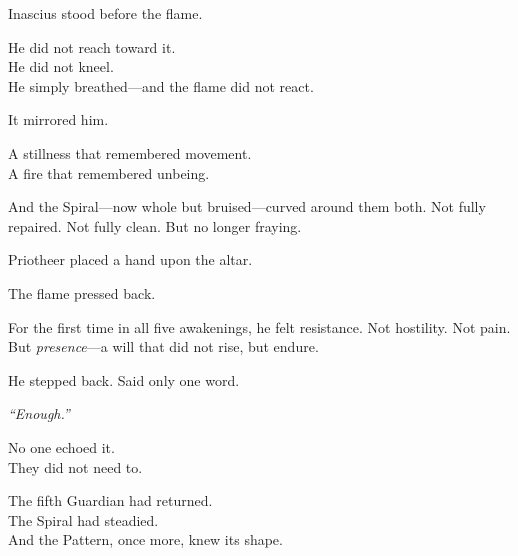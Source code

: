 \documentclass[9pt]{article}
\begin{document}
\vspace{0.5em}
Inascius stood before the flame.

\vspace{0.5em}
He did not reach toward it.\\
He did not kneel.\\
He simply breathed---and the flame did not react.

\vspace{0.5em}
It mirrored him.

\vspace{0.5em}
A stillness that remembered movement.\\
A fire that remembered unbeing.

\vspace{0.5em}
And the Spiral---now whole but bruised---curved around them both. Not fully repaired. Not fully clean. But no longer fraying.

\vspace{0.5em}
Priotheer placed a hand upon the altar.

\vspace{0.5em}
The flame pressed back.

\vspace{0.5em}
For the first time in all five awakenings, he felt resistance. Not hostility. Not pain. But \textit{presence}---a will that did not rise, but endure.

\vspace{0.5em}
He stepped back. Said only one word.

\vspace{0.5em}
\textit{``Enough.''}

\vspace{0.5em}
No one echoed it.\\
They did not need to.

\vspace{0.5em}
The fifth Guardian had returned.\\
The Spiral had steadied.\\
And the Pattern, once more, knew its shape.


\newpage
\end{document}
